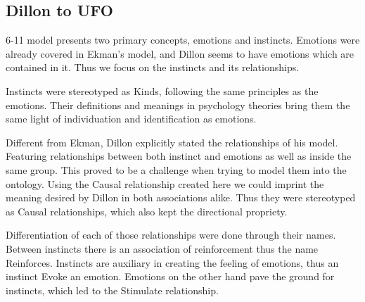 \subsection{Dillon to UFO}
6-11 model presents two primary concepts, emotions and instincts. Emotions were already covered in Ekman's model, and Dillon seems to have emotions which are contained in it. Thus we focus on the instincts and its relationships.

Instincts were stereotyped as Kinds, following the same principles as the emotions. Their definitions and meanings in psychology theories bring them the same light of individuation and identification as emotions.

Different from Ekman, Dillon explicitly stated the relationships of his model. Featuring relationships between both instinct and emotions as well as inside the same group. This proved to be a challenge when trying to model them into the ontology. Using the Causal relationship created here we could imprint the meaning desired by Dillon in both associations alike. Thus they were stereotyped as Causal relationships, which also kept the directional propriety.

Differentiation of each of those relationships were done through their names. Between instincts there is an association of reinforcement thus the name Reinforces. Instincts are auxiliary in creating the feeling of emotions, thus an instinct Evoke an emotion. Emotions on the other hand pave the ground for instincts, which led to the Stimulate relationship.